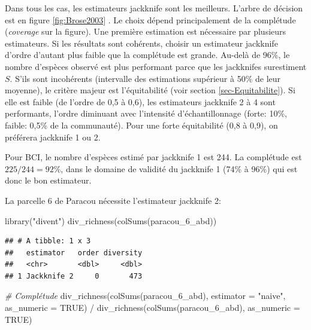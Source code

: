 \documentclass[
  11pt,
  american,
  a4paper,
  extrafontsizes,onecolumn,openright
  ]{memoir}
\newenvironment{Shaded}{\begin{snugshade}}{\end{snugshade}}
\newcommand{\AttributeTok}[1]{\textcolor[rgb]{0.77,0.63,0.00}{#1}}
\newcommand{\CommentTok}[1]{\textcolor[rgb]{0.56,0.35,0.01}{\textit{#1}}}
\newcommand{\ConstantTok}[1]{\textcolor[rgb]{0.00,0.00,0.00}{#1}}
\newcommand{\FunctionTok}[1]{\textcolor[rgb]{0.00,0.00,0.00}{#1}}
\newcommand{\NormalTok}[1]{#1}
\newcommand{\SpecialCharTok}[1]{\textcolor[rgb]{0.00,0.00,0.00}{#1}}
\newcommand{\StringTok}[1]{\textcolor[rgb]{0.31,0.60,0.02}{#1}}
\newlength{\rf}
\begin{document}
\normalsize

Dans tous les cas, les estimateurs jackknife sont les meilleurs.
L'arbre de décision est en figure \ref{fig:Brose2003} \autocite[fig.~6]{Brose2003}.
Le choix dépend principalement de la complétude (\emph{coverage} sur la figure).
Une première estimation est nécessaire par plusieurs estimateurs.
Si les résultats sont cohérents, choisir un estimateur jackknife d'ordre d'autant plus faible que la complétude est grande.
Au-delà de 96\%, le nombre d'espèces observé est plus performant parce que les jackknifes surestiment \(S\).
S'ils sont incohérents (intervalle des estimations supérieur à 50\% de leur moyenne), le critère majeur est l'équitabilité (voir section \ref{sec-Equitabilite}).
Si elle est faible (de l'ordre de 0,5 à 0,6), les estimateurs jackknife 2 à 4 sont performants, l'ordre diminuant avec l'intensité d'échantillonnage (forte: 10\%, faible: 0,5\% de la communauté).
Pour une forte équitabilité (0,8 à 0,9), on préférera jackknife 1 ou 2.

Pour BCI, le nombre d'espèces estimé par jackknife 1 est 244.
La complétude est \({225}/{244} = 92\%\), dans le domaine de validité du jackknife 1 (74\% à 96\%) qui est donc le bon estimateur.

La parcelle 6 de Paracou nécessite l'estimateur jackknife 2:

\scriptsize

\begin{Shaded}
\begin{Highlighting}[]
\FunctionTok{library}\NormalTok{(}\StringTok{"divent"}\NormalTok{)}
\FunctionTok{div\_richness}\NormalTok{(}\FunctionTok{colSums}\NormalTok{(paracou\_6\_abd))}
\end{Highlighting}
\end{Shaded}

\begin{verbatim}
## # A tibble: 1 x 3
##   estimator   order diversity
##   <chr>       <dbl>     <dbl>
## 1 Jackknife 2     0       473
\end{verbatim}

\begin{Shaded}
\begin{Highlighting}[]
\CommentTok{\# Complétude}
\FunctionTok{div\_richness}\NormalTok{(}\FunctionTok{colSums}\NormalTok{(paracou\_6\_abd), }\AttributeTok{estimator =} \StringTok{"naive"}\NormalTok{, }\AttributeTok{as\_numeric =} \ConstantTok{TRUE}\NormalTok{) }\SpecialCharTok{/} 
  \FunctionTok{div\_richness}\NormalTok{(}\FunctionTok{colSums}\NormalTok{(paracou\_6\_abd), }\AttributeTok{as\_numeric =} \ConstantTok{TRUE}\NormalTok{)}
\end{Highlighting}
\end{Shaded}
\end{document}
